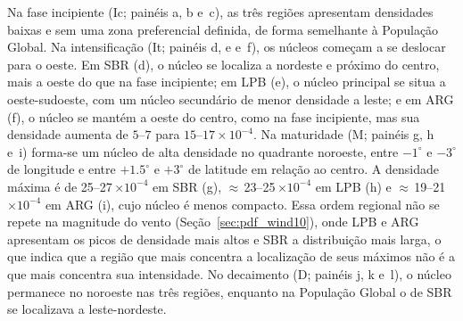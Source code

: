 Na fase incipiente (Ic; painéis a, b e~c), as três regiões apresentam densidades baixas e sem uma zona preferencial definida, de forma semelhante à População Global. Na intensificação (It; painéis d, e e~f), os núcleos começam a se deslocar para o oeste. Em SBR (d), o núcleo se localiza a nordeste e próximo do centro, mais a oeste do que na fase incipiente; em LPB (e), o núcleo principal se situa a oeste-sudoeste, com um núcleo secundário de menor densidade a leste; e em ARG (f), o núcleo se mantém a oeste do centro, como na fase incipiente, mas sua densidade aumenta de $5$--$7$ para $15$--$17\times10^{-4}$.
Na maturidade (M; painéis g, h e~i) forma-se um núcleo de alta densidade no quadrante noroeste, entre $-1^{\circ}$ e $-3^{\circ}$ de longitude e entre $+1.5^{\circ}$ e $+3^{\circ}$ de latitude em relação ao centro.
A densidade máxima é de 25--27\,$\times 10^{-4}$ em SBR (g), ${\approx}$\,23--25\,$\times 10^{-4}$ em LPB (h) e ${\approx}$\,19--21\,$\times 10^{-4}$ em ARG (i), cujo núcleo é menos compacto. Essa ordem regional não se repete na magnitude do vento (Seção~\ref{sec:pdf_wind10}), onde LPB e ARG apresentam os picos de densidade mais altos e SBR a distribuição mais larga, o que indica que a região que mais concentra a localização de seus máximos não é a que mais concentra sua intensidade.
No decaimento (D; painéis j, k e~l), o núcleo permanece no noroeste nas três regiões, enquanto na População Global o de SBR se localizava a leste-nordeste.

